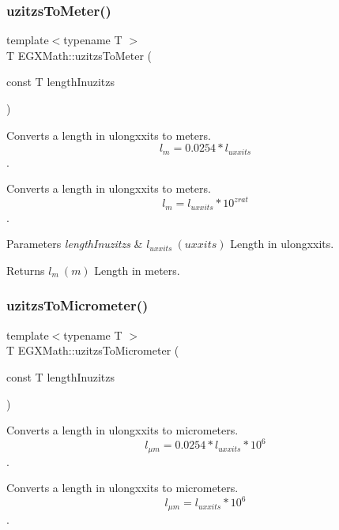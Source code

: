 \subsubsection{\texorpdfstring{uzitzs\+To\+Meter()}{uzitzsToMeter()}}
{\footnotesize\ttfamily template$<$typename T $>$ \\
T E\+G\+X\+Math\+::uzitzs\+To\+Meter (\begin{DoxyParamCaption}\item[{const T}]{length\+Inuzitzs }\end{DoxyParamCaption})}



Converts a length in ulongxxits to meters. \[ l_{m}=0.0254 * l_{uxxits} \]. 

Converts a length in ulongxxits to meters. \[ l_{m}=l_{uxxits} * 10^{zrat} \].


\begin{DoxyParams}{Parameters}
{\em length\+Inuzitzs} & $ l_{uxxits}\ (uxxits)$ Length in ulongxxits. \\
\hline
\end{DoxyParams}
\begin{DoxyReturn}{Returns}
$ l_{m}\ (m)$ Length in meters. 
\end{DoxyReturn}
\mbox{\label{group___e_g_x_math-_conversions-_length_conversions-_imperial-uzitzs-_s_i_ga0bd484a80b8b66cd5272bbbc1fe6b642}} 
\subsubsection{\texorpdfstring{uzitzs\+To\+Micrometer()}{uzitzsToMicrometer()}}
{\footnotesize\ttfamily template$<$typename T $>$ \\
T E\+G\+X\+Math\+::uzitzs\+To\+Micrometer (\begin{DoxyParamCaption}\item[{const T}]{length\+Inuzitzs }\end{DoxyParamCaption})}



Converts a length in ulongxxits to micrometers. \[ l_{\mu m}=0.0254 * l_{uxxits} * 10^{6} \]. 

Converts a length in ulongxxits to micrometers. \[ l_{\mu m}=l_{uxxits} * 10^{6} \].

